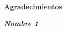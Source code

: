 
\begin{center}

\textbf{}

\vspace{2cm}

\Large{\textbf{Agradecimientos}}

\end{center}

\vspace{1cm}

\vspace{2cm}

\begin{flushright}

\textit{\textbf{Nombre 1}}

\end{flushright}


\pagestyle{empty}

